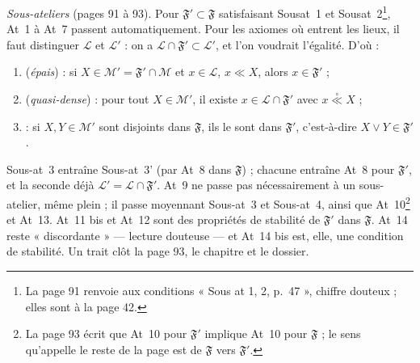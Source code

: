 \documentclass[11pt,a4paper]{article}
\begin{document}
\emph{Sous-ateliers} (pages 91 à 93). Pour $\mathfrak{F}' \subset \mathfrak{F}$
satisfaisant Sousat~1 et Sousat~2\footnote{La page 91 renvoie aux conditions
« Sous at 1, 2, p.~47 », chiffre douteux ; elles sont à la page 42.}, At~1 à
At~7 passent automatiquement. Pour les axiomes où entrent les lieux, il faut
distinguer $\mathcal{L}$ et $\mathcal{L}'$ : on a $\mathcal{L} \cap \mathfrak{F}'
\subset \mathcal{L}'$, et l'on voudrait l'égalité. D'où :
\begin{enumerate}
\item[Sous-at~3] (\emph{épais}) : si $X \in \mathcal{M}' = \mathfrak{F}' \cap
\mathcal{M}$ et $x \in \mathcal{L}$, $x \ll X$, alors $x \in \mathfrak{F}'$ ;
\item[Sous-at~3'] (\emph{quasi-dense}) : pour tout $X \in \mathcal{M}'$, il existe
$x \in \mathcal{L} \cap \mathfrak{F}'$ avec $x \mathrel{\overset{\circ}{\ll}} X$ ;
\item[Sous-at~4] : si $X, Y \in \mathcal{M}'$ sont disjoints dans $\mathfrak{F}$,
ils le sont dans $\mathfrak{F}'$, c'est-à-dire $X \vee Y \in \mathfrak{F}'$.
\end{enumerate}
Sous-at~3 entraîne Sous-at~3' (par At~8 dans $\mathfrak{F}$) ; chacune entraîne
At~8 pour $\mathfrak{F}'$, et la seconde déjà $\mathcal{L}' = \mathcal{L} \cap
\mathfrak{F}'$. At~9 ne passe pas nécessairement à un sous-atelier, même plein ;
il passe moyennant Sous-at~3 et Sous-at~4, ainsi que At~10\footnote{La page 93
écrit que At~10 pour $\mathfrak{F}'$ implique At~10 pour $\mathfrak{F}$ ; le sens
qu'appelle le reste de la page est de $\mathfrak{F}$ vers $\mathfrak{F}'$.} et
At~13. At~11 bis et At~12 sont des propriétés de stabilité de $\mathfrak{F}'$ dans
$\mathfrak{F}$. At~14 reste « discordante » --- lecture douteuse --- et At~14 bis
est, elle, une condition de stabilité. Un trait clôt la page 93, le chapitre et
le dossier.
\end{document}
